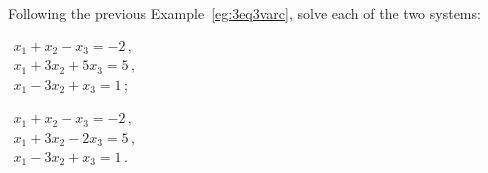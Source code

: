 \begin{example} \label{eg:3eq3vard}
Following the previous Example~\ref{eg:3eq3varc}, solve each of the two systems:
\begin{parts}
\item \(\begin{array}{l}
x_1+x_2-x_3=-2\,,\\
x_1+3x_2+5x_3=5\,,\\
x_1-3x_2+x_3=1\,;
\end{array}\)
\item \(\begin{array}{l}
x_1+x_2-x_3=-2\,,\\
x_1+3x_2-2x_3=5\,,\\
x_1-3x_2+x_3=1\,.
\end{array}\)
\end{parts}


\end{example}
